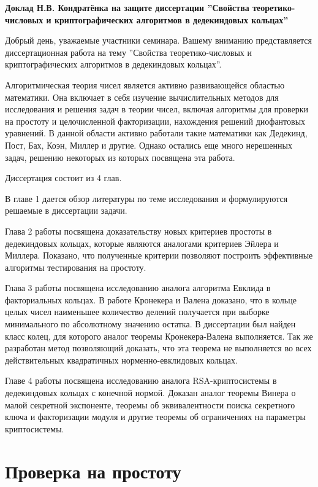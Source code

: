 \documentclass[a4paper,12pt]{article} %
\begin{document}
\begin{center}
    \textbf{Доклад Н.В. Кондратёнка на защите диссертации ''Свойства теоретико-числовых и криптографических алгоритмов в дедекиндовых кольцах''}
\end{center}

Добрый день, уважаемые участники семинара.
Вашему вниманию представляется диссертационная работа на тему ''Свойства теоретико-числовых и криптографических алгоритмов в дедекиндовых кольцах''.

Алгоритмическая теория чисел является активно развивающейся областью математики.
Она включает в себя изучение вычислительных методов для исследования и решения задач в теории чисел, включая алгоритмы для проверки на простоту и целочисленной факторизации, нахождения решений диофантовых уравнений.
В данной области активно работали такие математики как Дедекинд, Пост, Бах, Коэн, Миллер и другие.
Однако остались еще много нерешенных задач, решению некоторых из которых посвящена эта работа.

Диссертация состоит из 4 глав.

В главе 1 дается обзор литературы по теме исследования и формулируются решаемые в диссертации задачи.

Глава 2 работы посвящена доказательству новых критериев простоты в дедекиндовых кольцах, которые являются аналогами критериев Эйлера и Миллера.
Показано, что полученные критерии позволяют построить эффективные алгоритмы тестирования на простоту.

Глава 3 работы посвящена исследованию аналога алгоритма Евклида в факториальных кольцах.
В работе Кронекера и Валена доказано, что в кольце целых чисел наименьшее количество делений получается при выборке минимального по абсолютному значению остатка.
В диссертации был найден класс колец, для которого аналог теоремы Кронекера-Валена выполняется.
Так же разработан метод позволяющий доказать, что эта теорема не выполняется во всех действительных квадратичных норменно-евклидовых кольцах.
    
Главе 4 работы посвящена исследованию аналога RSA-криптосистемы в дедекиндовых кольцах с конечной нормой.
Доказан аналог теоремы Винера о малой секретной экспоненте, теоремы об эквивалентности поиска секретного ключа и факторизации модуля и другие теоремы об ограничениях на параметры криптосистемы.

\section{Проверка на простоту}
\end{document}
